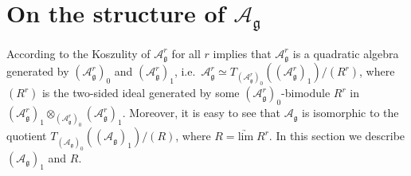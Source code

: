 \documentclass{amsart}
\renewcommand{\gg}{\mathfrak{g}}
\newcommand{\limarr}{\underrightarrow{\mathrm{lim}} \;}
\theoremstyle{definition}
\numberwithin{equation}{section}
\begin{document}
\section{On the structure of $\mathcal A_\gg$}

According to \cite{BGS} the Koszulity of   $\mathcal A^r_\gg$ for all
$r$ implies that  $\mathcal A^r_\gg$ is a quadratic algebra generated by  $(\mathcal A^r_\gg)_0$ and  $(\mathcal A^r_\gg)_1$, i.e.\  $\mathcal A^r_\gg\simeq T_{(\mathcal A^r_\gg)_0}( (\mathcal A^r_\gg)_1)/(R^r)$,
where $(R^r)$ is the two-sided ideal generated by some  $(\mathcal A^r_\gg)_0$-bimodule $R^r$ in $(\mathcal A^r_\gg)_1\otimes _ {(\mathcal A^r_\gg)_0} (\mathcal A^r_\gg)_1$.  Moreover, it is easy to see that $\mathcal A_\gg$ is isomorphic to the quotient $T_{(\mathcal A_\gg)_0}( (\mathcal A_\gg)_1)/(R)$, where $R = \limarr R^r$.
In this section we describe $(\mathcal A_\gg)_1$ and $R$.
\end{document}
